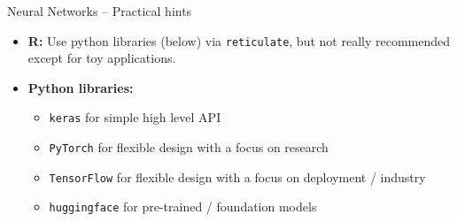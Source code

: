 \begin{frame}{Neural Networks -- Practical hints}
% 
% 
% 
% 
% 

\medskip
 

\begin{itemize}
  \item \textbf{R:} Use python libraries (below) via \texttt{reticulate}, but not really recommended except for toy applications.
  \item \textbf{Python libraries:} 
  \begin{itemize}
      \item \texttt{keras} for simple high level API 
      \item \texttt{PyTorch} for flexible design with a focus on research
      \item \texttt{TensorFlow} for flexible design with a focus on deployment / industry
      \item \texttt{huggingface} for pre-trained / foundation models
  \end{itemize}
\end{itemize}

\end{frame}




